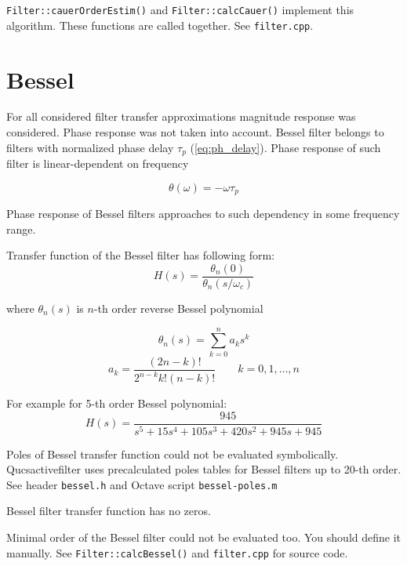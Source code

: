 \verb|Filter::cauerOrderEstim()| and \verb|Filter::calcCauer()| implement this
algorithm. These functions are called together. See \verb|filter.cpp|.

\section{Bessel}

For all considered filter transfer approximations magnitude response was 
considered. Phase response was not taken into account. Bessel filter belongs to 
filters with normalized phase delay $\tau_p$ (\ref{eq:ph_delay}). Phase response 
of such filter is linear-dependent on frequency

\begin{equation}
 \theta(\omega) = -\omega \tau_p
\end{equation}

Phase response of Bessel filters approaches to such dependency in some 
frequency range.

Transfer function of the Bessel filter has following form:
\begin{equation}
 H(s)=\frac{\theta_n(0)}{\theta_n(s/\omega_c)}
\end{equation}

where $\theta_n(s)$ is $n$-th order reverse Bessel polynomial

\begin{equation}
 \theta_n(s)=\sum_{k=0}^{n}a_ks^k
\end{equation}
\begin{equation}
 a_k=\frac{(2n-k)!}{2^{n-k}k!(n-k)!}\qquad k=0,1,\ldots,n
\end{equation}


For example for 5-th order Bessel polynomial:
\begin{equation}
 H(s)=\frac{945}{s^5+15s^4+105s^3+420s^2+945s+945}
\end{equation}

Poles of Bessel transfer function could not be evaluated symbolically. 
Qucsactivefilter uses precalculated poles tables for Bessel filters up to 
20-th order. See header \verb|bessel.h| and Octave script \verb|bessel-poles.m|

Bessel filter transfer function has no zeros. 

Minimal order of the Bessel filter could not be evaluated too. You should 
define it manually. See \verb|Filter::calcBessel()| and \verb|filter.cpp| for 
source code.




